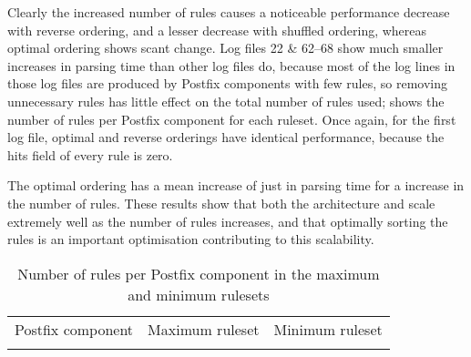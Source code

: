 Clearly the increased number of rules causes a noticeable performance
decrease with reverse ordering, and a lesser decrease with shuffled
ordering, whereas optimal ordering shows scant change.  Log files 22 \&
62--68 show much smaller increases in parsing time than other log files do,
because most of the log lines in those log files are produced by Postfix
components with few rules, so removing unnecessary rules has little effect
on the total number of rules used;  shows the number of rules
per Postfix component for each ruleset.  Once again, for the first log
file, optimal and reverse orderings have identical performance, because the
hits field of every rule is zero.

The optimal ordering has a mean increase of just
 in parsing time
for a \numberOFrulesMAXIMUMpercentage{} increase in the number of rules.
These results show that both the architecture and \parsername{} scale
extremely well as the number of rules increases, and that optimally sorting
the rules is an important optimisation contributing to this scalability.



\begin{table}[thbp]
    \caption{Number of rules per Postfix component in the maximum and
    minimum rulesets}
    \empty{}\label{Number of rules per Postfix component in the maximum and
    minimum rulesets}
    \centering{}
    \begin{tabular}{lrr}
        \tabletopline{}%
        Postfix component & Maximum ruleset & Minimum ruleset \\
        \tablemiddleline{}%
        
        \tablebottomline{}%
    \end{tabular}
\end{table}

\FloatBarrier{}

